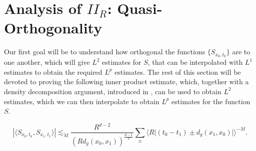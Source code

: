 




% 

\section{Analysis of $II_R$: Quasi-Orthogonality}

Our first goal will be to understand how orthogonal the functions $\{ {S\!}_{x_0,t_0} \}$ are to one another, which will give $L^2$ estimates for $S$, that can be interpolated with $L^1$ estimates to obtain the required $L^p$ estimates. The rest of this section will be devoted to proving the following inner product estimate, which, together with a density decomposition argument, introduced in \cite{HeoandNazarovandSeeger}, can be used to obtain $L^2$ estimates, which we can then interpolate to obtain $L^p$ estimates for the function $S$.

\begin{lemma} \label{mainOrthogonalityLemma}
    \[ \left| \langle {S\!}_{x_0,t_0}, {S\!}_{x_1,t_1} \rangle \right| \lesssim_M \frac{R^{d-2}}{( R d_g(x_0,x_1) )^{\frac{d-1}{2}}} \sum_{\pm} \Big\langle R \big| (t_0 - t_1) \pm d_g(x_1,x_0) \big| \Big\rangle^{-M}. \]
\end{lemma}

